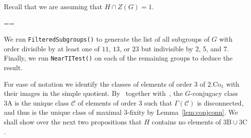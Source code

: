 \documentclass[11pt, a4paper]{amsart}
\makeatletter
\renewcommand{\proofname}{Proof}
\renewenvironment{proof}[1][\proofname]{\par
  \pushQED{\qed}  \normalfont \partopsep=\z@skip \topsep=\z@skip
  \trivlist
  \item[\hskip\labelsep
        \scshape
    #1\@addpunct{.}]\ignorespaces
}{  \popQED\endtrivlist\@endpefalse
}
\makeatother
\begin{document}
Recall that we are assuming that $H\cap Z(G)=1$.

\begin{proof}
    We run {\tt{FilteredSubgroups()}} to generate the list of all subgroups of $G$ with order divisible by at least one of $11$, $13$, or $23$ but indivisible by 2, 5, and 7. Finally, we run {\tt{NearTITest()}} on each of the remaining groups to deduce the result.
\end{proof}

For ease of notation we identify the classes of elements of order 3 of $2.\mathrm{Co}_1$ with their images in the simple quotient. By~\cite[Propositions 3.1, 3.2, and 3.3]{CDP} together with~\cite[Lemma 2.12]{CDP}, the $G$-conjugacy class $\mathrm{3A}$ is the unique class $\mathcal{C}$ of elements of order 3 such that $\Gamma(\mathcal{C})$ is disconnected, and thus is the unique class of maximal 3-fixity by Lemma~\ref{lem:conjconn}. We shall show over the next two propositions that $H$ contains no elements of $\mathrm{3B}\cup\mathrm{3C}$.
\end{document}

